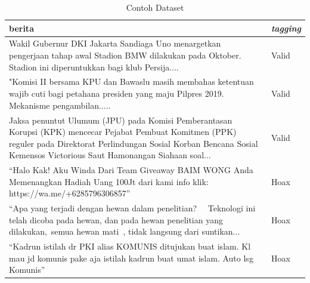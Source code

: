 \begin{table}[h]
    \caption{Contoh Dataset}
    \label{tab:contoh_dataset}
    \centering
    \begin{tabular}{ | p{.8\linewidth} | l | }
        \hline
        \textbf{berita}                                                                                                                                                                                                                   & \textbf{\textit{tagging}} \\ \hline
        Wakil Gubernur DKI Jakarta Sandiaga Uno menargetkan pengerjaan tahap awal Stadion BMW dilakukan pada Oktober. Stadion ini diperuntukkan bagi klub Persija....                                                                     & Valid                     \\ \hline
        "Komisi II bersama KPU dan Bawaslu masih membahas ketentuan wajib cuti bagi petahana presiden yang maju Pilpres 2019. Mekanisme pengambilan.....                                                                                  & Valid                     \\ \hline
        Jaksa penuntut Ulumum (JPU) pada Komisi Pemberantasan Korupsi (KPK) mencecar Pejabat Pembuat Komitmen (PPK) reguler pada Direktorat Perlindungan Sosial Korban Bencana Sosial Kemensos Victorious Saut Hamonangan Siahaan soal... & Valid                     \\ \hline
        “Halo Kak! Aku Winda Dari Team Giveaway BAIM WONG Anda Memenangkan Hadiah Uang 100Jt dari kami info klik: https://wa.me/+6285796306857”                                                                                           & Hoax                      \\ \hline
        “Apa yang terjadi dengan hewan dalam penelitian?   Teknologi ini telah dicoba pada hewan, dan pada hewan penelitian yang dilakukan, semua hewan mati , tidak langsung dari suntikan...                                            & Hoax                      \\ \hline
        “Kadrun istilah dr PKI alias KOMUNIS ditujukan buat islam. Kl mau jd komunis pake aja istilah kadrun buat umat islam. Auto lsg Komunis”                                                                                           & Hoax                      \\ \hline
    \end{tabular}
\end{table}

